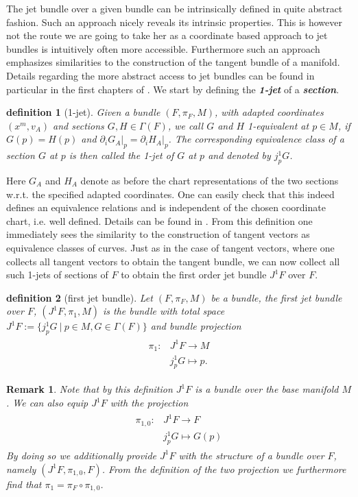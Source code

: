 \documentclass[a4paper,12pt, DIV=14, BCOR=5mm, twoside, headsepline]{scrbook}
\newtheorem{definition}{definition}[section]
\newtheorem*{remark}{Remark}
\begin{document}
The jet bundle over a given bundle can be intrinsically defined in quite abstract fashion. Such an approach nicely reveals its intrinsic properties. This is however not the route we are going to take her as a coordinate based approach to jet bundles is intuitively often more accessible. Furthermore such an approach emphasizes similarities to the construction of the tangent bundle of a manifold. Details regarding the more abstract access to jet bundles can be found in particular in the first chapters of \cite{seiler2009involution}. 
We start by defining the \textbf{\textit{1-jet}} of a \textbf{\textit{section}}.
\begin{definition}[1-jet] 
Given a bundle $(F, \pi_F, M)$, with adapted coordinates $(x^m, v_A)$ and sections $G,H \in \Gamma(F)$, we call $G$ and $H$ 1-equivalent at $p \in M$, if $G(p) = H(p)$ and $\partial_i G_A \vert_p = \partial_i H_A \vert_p$. The corresponding equivalence class of a section $G$ at $p$ is then called the 1-jet of $G$ at $p$ and denoted by $j^1_pG$.
\end{definition}
Here $G_A$ and $H_A$ denote as before the chart representations of the two sections w.r.t. the specified adapted coordinates. One can easily check that this indeed defines an equivalence relations and is independent of the chosen coordinate chart, i.e. well defined. Details can be found in \cite{saunders_1989}. From this definition one immediately sees the similarity to the construction of tangent vectors as equivalence classes of curves. Just as in the case of tangent vectors, where one collects all tangent vectors to obtain the tangent bundle, we can now collect all such 1-jets of sections of $F$ to obtain the first order jet bundle $J^1F$ over $F$. 
\begin{definition}[first jet bundle]
Let $(F, \pi_F, M)$ be a bundle, the first jet bundle over $F$, $(J^1F,\pi_1,M)$ is the bundle with total space $J^1F := \{j^1_pG \ \vert \  p \in M, G \in \Gamma(F)\}$ and bundle projection 
\begin{align*}
    \begin{aligned}
\pi_1 : &J^1F \longrightarrow M \\
&j^1_pG \longmapsto p.
    \end{aligned}
\end{align*}
\end{definition}
\begin{remark}
Note that by this definition $J^1F$ is a bundle over the base manifold $M$. We can also equip $J^1F$ with the projection 
\begin{align}
    \begin{aligned}
    \pi_{1,0} : &J^1F \longrightarrow F \\
    &j^1_pG \longmapsto G(p)
    \end{aligned}
\end{align}
By doing so we additionally provide $J^1F$ with the structure of a bundle over $F$, namely $(J^1F,\pi_{1,0},F)$. From the definition of the two projection we furthermore find that $\pi_1 = \pi_F \circ \pi_{1,0}$. 
\end{remark}
\end{document}
